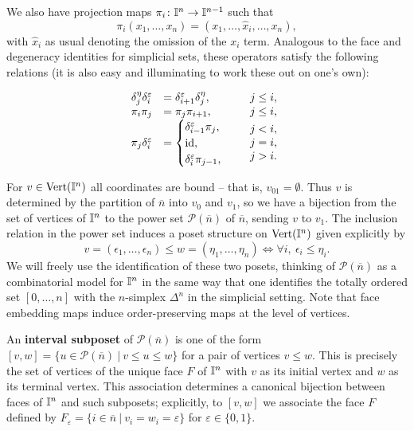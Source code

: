 We also have projection maps $\pi_i \colon \mathbb{I}^n \to \mathbb{I}^{n-1}$ such that
\[\pi_i(x_1, \ldots, x_n) = (x_1, \ldots, \hat x_i, \ldots, x_n),\]
with $\hat x_i$ as usual denoting the omission of the $x_i$ term.
Analogous to the face and degeneracy identities for simplicial sets, these operators satisfy the following relations \cite[Section 4]{GrMa03} (it is also easy and illuminating to work these out on one's own):

\[
\begin{array}{rlc}
	\delta_j^\eta \delta_i^\varepsilon &= \delta_{i+1}^\varepsilon \delta_j^\eta, &j\leq i,\\
	\pi_i \pi_j &= \pi_j \pi_{i+1}, & j \leq i,\\
	\pi_j \delta^\varepsilon_i &=
	\begin{cases}
		\delta_{i-1}^\varepsilon \pi_j, \\
		\mathrm{id},\\
		\delta_i^\varepsilon \pi_{j-1},
	\end{cases}
	&\begin{array}{lll}j<i, \\ j=i, \\ j>i. \end{array}
\end{array}
\]

For $v \in {\rm Vert}(\mathbb{I}^n)$ all coordinates are bound -- that is, $v_{01} = \emptyset$.
Thus $v$ is determined by the partition of $\overline n$ into $v_0$ and $v_1$, so
we have a bijection from the set of vertices of $\mathbb{I}^n$ to the power set $\mathcal P(\overline n)$ of $\overline n$, sending $v$ to $v_1$.
The inclusion relation in the power set induces a poset structure on ${\rm Vert}(\mathbb{I}^n)$ given explicitly by
\begin{equation*}
	v = (\epsilon_1, \dots, \epsilon_n) \leq w = (\eta_1, \dots, \eta_n) \iff \forall i,\ \epsilon_i \leq \eta_i.
\end{equation*}
We will freely use the identification of these two posets, thinking of $\mathcal P(\overline n)$ as a combinatorial model for $\mathbb{I}^n$ in the same way that one identifies the totally ordered set $[0,\dots, n]$ with the $n$-simplex $\Delta^n$ in the simplicial setting.
Note that face embedding maps induce order-preserving maps at the level of vertices.

An \textbf{interval subposet} of $\mathcal P(\overline n)$ is one of the form $[v, w] = \{u \in \mathcal P(\overline n)\ |\ v \leq u \leq w\}$ for a pair of vertices $v \leq w$.
This is precisely the set of vertices of the unique face $F$ of $\mathbb{I}^n$ with $v$ as its initial vertex and $w$ as its terminal vertex.
This association determines a canonical bijection between faces of $\mathbb{I}^n$ and such subposets; explicitly, to $[v, w]$ we associate the face $F$ defined by $F_\varepsilon = \{i \in \overline{n}\ |\ v_i = w_i = \varepsilon\}$ for $\varepsilon \in \{0, 1\}$.

